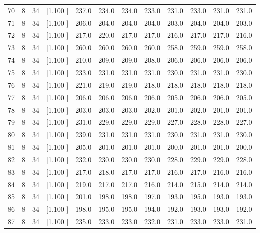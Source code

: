 \documentclass[12pt,a4paper]{article}
\begin{document}
\begin{center}
{\begin{tabular}{r r r r r r r r r r r r}
  70&  8& 34&[1.100     ]&   237.0&   234.0&   234.0&   233.0&   231.0&   233.0&   231.0&   231.0\\[-0.02in]
  71&  8& 34&[1.100     ]&   206.0&   204.0&   204.0&   204.0&   203.0&   204.0&   204.0&   203.0\\[-0.02in]
  72&  8& 34&[1.100     ]&   217.0&   220.0&   217.0&   217.0&   216.0&   217.0&   217.0&   216.0\\[-0.02in]
  73&  8& 34&[1.100     ]&   260.0&   260.0&   260.0&   260.0&   258.0&   259.0&   259.0&   258.0\\[-0.02in]
  74&  8& 34&[1.100     ]&   210.0&   209.0&   209.0&   208.0&   206.0&   206.0&   206.0&   206.0\\[-0.02in]
  75&  8& 34&[1.100     ]&   233.0&   231.0&   231.0&   231.0&   230.0&   231.0&   231.0&   230.0\\[-0.02in]
  76&  8& 34&[1.100     ]&   221.0&   219.0&   219.0&   218.0&   218.0&   218.0&   218.0&   218.0\\[-0.02in]
  77&  8& 34&[1.100     ]&   206.0&   206.0&   206.0&   206.0&   205.0&   206.0&   206.0&   205.0\\[-0.02in]
  78&  8& 34&[1.100     ]&   203.0&   203.0&   203.0&   202.0&   201.0&   202.0&   201.0&   201.0\\[-0.02in]
  79&  8& 34&[1.100     ]&   231.0&   229.0&   229.0&   229.0&   227.0&   228.0&   228.0&   227.0\\[-0.02in]
  80&  8& 34&[1.100     ]&   239.0&   231.0&   231.0&   231.0&   230.0&   231.0&   231.0&   230.0\\[-0.02in]
  81&  8& 34&[1.100     ]&   205.0&   201.0&   201.0&   201.0&   200.0&   201.0&   201.0&   200.0\\[-0.02in]
  82&  8& 34&[1.100     ]&   232.0&   230.0&   230.0&   230.0&   228.0&   229.0&   229.0&   228.0\\[-0.02in]
  83&  8& 34&[1.100     ]&   217.0&   218.0&   217.0&   217.0&   216.0&   217.0&   216.0&   216.0\\[-0.02in]
  84&  8& 34&[1.100     ]&   219.0&   217.0&   217.0&   216.0&   214.0&   215.0&   214.0&   214.0\\[-0.02in]
  85&  8& 34&[1.100     ]&   201.0&   198.0&   198.0&   197.0&   193.0&   195.0&   193.0&   193.0\\[-0.02in]
  86&  8& 34&[1.100     ]&   198.0&   195.0&   195.0&   194.0&   192.0&   193.0&   193.0&   192.0\\[-0.02in]
  87&  8& 34&[1.100     ]&   235.0&   233.0&   233.0&   232.0&   231.0&   233.0&   233.0&   231.0\\[-0.02in]

\end{tabular}}
\end{center}
\end{document}

